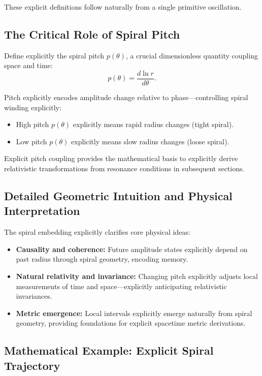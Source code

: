 These explicit definitions follow naturally from a single primitive oscillation.

\subsection{The Critical Role of Spiral Pitch}

Define explicitly the spiral pitch $p(\theta)$, a crucial dimensionless quantity coupling space and time:
\begin{equation}
    p(\theta)=\frac{d\ln r}{d\theta}.
\end{equation}

Pitch explicitly encodes amplitude change relative to phase—controlling spiral winding explicitly:
\begin{itemize}
    \item High pitch $p(\theta)$ explicitly means rapid radius changes (tight spiral).
    \item Low pitch $p(\theta)$ explicitly means slow radius changes (loose spiral).
\end{itemize}

Explicit pitch coupling provides the mathematical basis to explicitly derive relativistic transformations from resonance conditions in subsequent sections.

\subsection{Detailed Geometric Intuition and Physical Interpretation}

The spiral embedding explicitly clarifies core physical ideas:
\begin{itemize}
    \item \textbf{Causality and coherence:} Future amplitude states explicitly depend on past radius through spiral geometry, encoding memory.
    \item \textbf{Natural relativity and invariance:} Changing pitch explicitly adjusts local measurements of time and space—explicitly anticipating relativistic invariances.
    \item \textbf{Metric emergence:} Local intervals explicitly emerge naturally from spiral geometry, providing foundations for explicit spacetime metric derivations.
\end{itemize}

\subsection{Mathematical Example: Explicit Spiral Trajectory}

